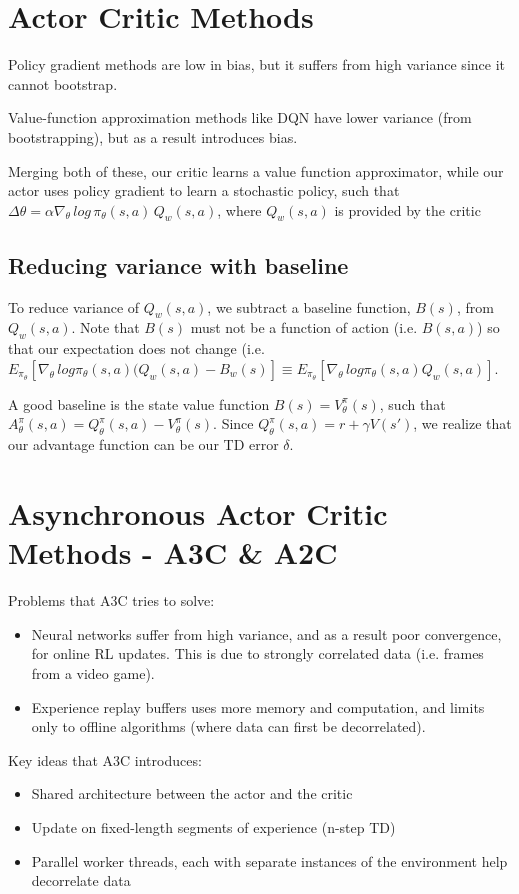 \documentclass[12pt]{article} %
\begin{document}
\section{Actor Critic Methods}
Policy gradient methods are low in bias, but it suffers from high variance since it cannot bootstrap.

Value-function approximation methods like DQN have lower variance (from bootstrapping), but as a result introduces bias.

Merging both of these, our critic learns a value function approximator, while our actor uses policy gradient to learn a stochastic policy, such that $\Delta\theta = \alpha \nabla_\theta\, log\, \pi_\theta (s,a)\, Q_w(s,a)$, where $Q_w(s,a)$ is provided by the critic
\subsection{Reducing variance with baseline}
To reduce variance of $Q_w(s,a)$, we subtract a baseline function, $B(s)$, from $Q_w(s,a)$. Note that $B(s)$ must not be a function of action (i.e. $B(s,a)$) so that our expectation does not change (i.e. $E_{\pi_\theta}[\nabla_\theta\,log\pi_\theta(s,a)(Q_w(s,a)-B_w(s)] \equiv E_{\pi_\theta}[\nabla_\theta\,log\pi_\theta(s,a)Q_w(s,a)]$.

A good baseline is the state value function $B(s)=V^\pi_\theta(s)$, such that $A^\pi_\theta(s,a) = Q^\pi_\theta(s,a) - V^\pi_\theta(s)$. Since $Q^\pi_\theta(s,a)=r+\gamma V(s')$, we realize that our advantage function can be our TD error $\delta$.

\section{Asynchronous Actor Critic Methods - A3C \& A2C}
Problems that A3C tries to solve:
\begin{itemize}
    \item Neural networks suffer from high variance, and as a result poor convergence, for online RL updates. This is due to strongly correlated data (i.e. frames from a video game).
    \item Experience replay buffers uses more memory and computation, and limits only to offline algorithms (where data can first be decorrelated).
\end{itemize}
Key ideas that A3C introduces:
\begin{itemize}
    \item Shared architecture between the actor and the critic
    \item Update on fixed-length segments of experience (n-step TD)
    \item Parallel worker threads, each with separate instances of the environment help decorrelate data
\end{itemize}
\end{document}

